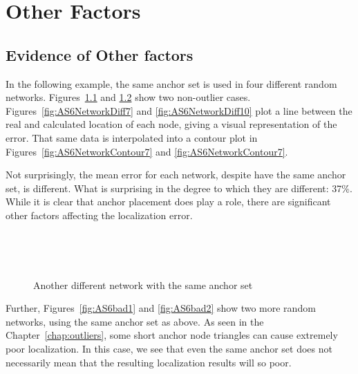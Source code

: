 \chapter{Other Factors}

\section{Evidence of Other factors}

In the following example, the same anchor set is used in four different random networks.  Figures~\ref{fig:AS6good1} and \ref{fig:AS6good2} show two non-outlier cases.  Figures~\ref{fig:AS6NetworkDiff7} and \ref{fig:AS6NetworkDiff10} plot a line between the real and calculated location of each node, giving a visual representation of the error.  That same data is interpolated into a contour plot in Figures~\ref{fig:AS6NetworkContour7} and \ref{fig:AS6NetworkContour7}.

Not surprisingly, the mean error for each network, despite have the same anchor set, is different.  What is surprising in the degree to which they are different: 37\%.  While it is clear that anchor placement does play a role, there are significant other factors affecting the localization error.

\begin{figure}
  \centering
\\
	\label{fig:AS6good1}		
\end{figure}
\begin{figure}
  \centering
\\
	\caption{Another different network with the same anchor set}
	\label{fig:AS6good2}
\end{figure}

Further, Figures~\ref{fig:AS6bad1} and \ref{fig:AS6bad2} show two more random networks, using the same anchor set as above.  As seen in the Chapter~\ref{chap:outliers}, some short anchor node triangles can cause extremely poor localization.  In this case, we see that even the same anchor set does not necessarily mean that the resulting localization results will so poor.  

